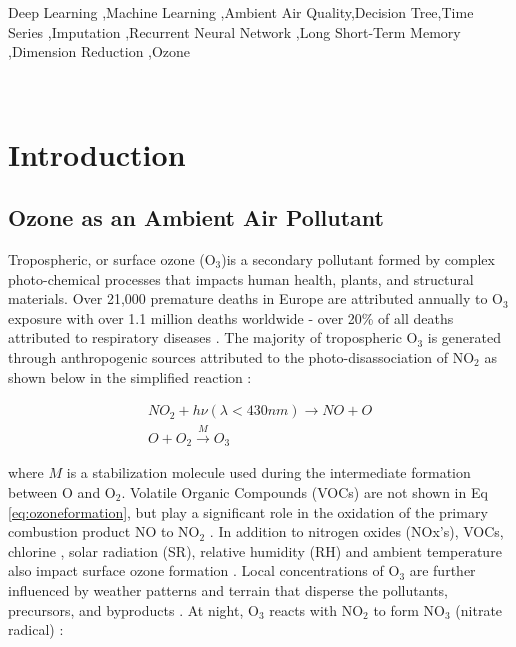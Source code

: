 \documentclass[preprint,12pt,authoryear]{elsarticle}
\begin{document}
\begin{linenumbers}
\begin{frontmatter}
\begin{abstract}
\end{abstract}

\begin{keyword}
Deep Learning \sep Machine Learning \sep Ambient Air Quality\sep Decision Tree\sep Time Series \sep Imputation \sep Recurrent Neural Network \sep Long Short-Term Memory \sep Dimension Reduction \sep Ozone
\end{keyword}

\end{frontmatter}
 
\section{Introduction}

\subsection{Ozone as an Ambient Air Pollutant}
Tropospheric, or surface ozone (O$_{3}$)is a secondary pollutant formed by complex photo-chemical processes that impacts human health, plants, and structural materials. Over 21,000 premature deaths in Europe are attributed annually to O$_{3}$ exposure \citep{WHO2008} with over 1.1 million deaths worldwide - over 20\% of all deaths attributed to respiratory diseases \citep{Malley2017}. The majority of tropospheric O$_{3}$ is generated through anthropogenic sources \citep{Lelieveld2000, Cooper2006} attributed to the photo-disassociation of NO$_{2}$ as shown below in the simplified reaction \citep{Finlayson1993}:

\begin{equation}
\label{eq:ozoneformation}
\begin{gathered}
NO_{2}+h\nu (\lambda < 430nm) \rightarrow NO+O \\
O+O_{2}\overset{M}{\rightarrow} O_{3}
\end{gathered}
\end{equation}

where $M$ is a stabilization molecule used during the intermediate formation between O and O$_{2}$. Volatile Organic Compounds (VOCs) are not shown in Eq \ref{eq:ozoneformation}, but play a significant role in the oxidation of the primary combustion product NO to NO$_{2}$ \citep{Song2011}. In addition to nitrogen oxides (NOx's), VOCs, chlorine \citep{Thornton2010}, solar radiation (SR), relative humidity (RH) and ambient temperature also impact surface ozone formation \citep{Sadanaga2003}.  Local concentrations of O$_{3}$ are further influenced by weather patterns and terrain that disperse the pollutants, precursors, and byproducts \citep{Beck1998}. At night, O$_{3}$ reacts with NO$_{2}$ to form NO$_{3}$ (nitrate radical) \citep{Finlayson1993}:


\end{linenumbers}
\end{document}
